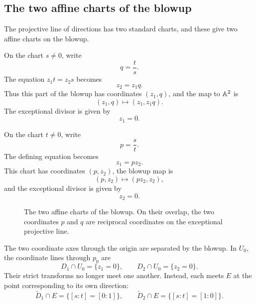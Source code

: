 \subsection{The two affine charts of the blowup}

The projective line of directions has two standard charts, and these
give two affine charts on the blowup.

On the chart \(s\neq0\), write
\[
q=\frac{t}{s}.
\]
The equation \(z_1t=z_2s\) becomes
\[
z_2=z_1q.
\]
Thus this part of the blowup has coordinates \((z_1,q)\), and the map
to \(\mathbb{A}^2\) is
\[
(z_1,q)\longmapsto(z_1,z_1q).
\]
The exceptional divisor is given by
\[
z_1=0.
\]

On the chart \(t\neq0\), write
\[
p=\frac{s}{t}.
\]
The defining equation becomes
\[
z_1=pz_2.
\]
This chart has coordinates \((p,z_2)\), the blowup map is
\[
(p,z_2)\longmapsto(pz_2,z_2),
\]
and the exceptional divisor is given by
\[
z_2=0.
\]

\begin{figure}[ht]
\centering
{}
\caption{The two affine charts of the blowup. On their overlap, the
two coordinates \(p\) and \(q\) are reciprocal coordinates on the
exceptional projective line.}
\label{fig:a2-blowup-charts}
\end{figure}

The two coordinate axes through the origin are separated by the
blowup. In \(U_0\), the coordinate lines through \(p_0\) are
\[
D_1\cap U_0=\{z_1=0\},
\qquad
D_2\cap U_0=\{z_2=0\}.
\]
Their strict transforms no longer meet one another. Instead, each
meets \(E\) at the point corresponding to its own direction:
\[
\widetilde D_1\cap E=\{[s:t]=[0:1]\},
\qquad
\widetilde D_2\cap E=\{[s:t]=[1:0]\}.
\]


